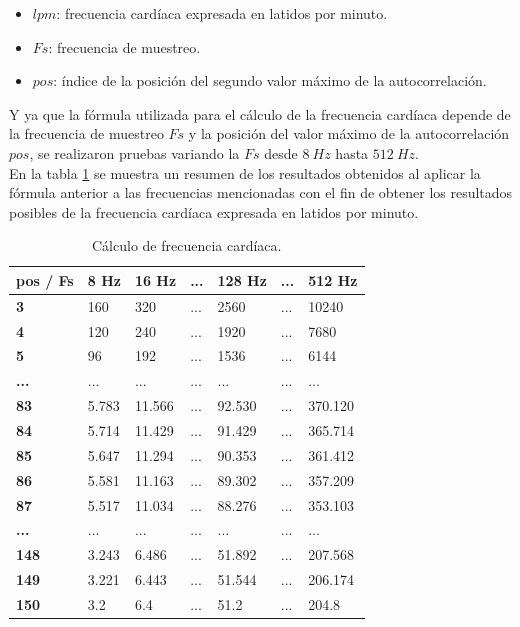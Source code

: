 \begin{itemize}
	\item $lpm$: frecuencia cardíaca expresada en latidos por minuto.
	\item $Fs$: frecuencia de muestreo.
	\item $pos$: índice de la posición del segundo valor máximo de la autocorrelación.
\end{itemize}

Y ya que la fórmula utilizada para el cálculo de la frecuencia cardíaca depende de la frecuencia de muestreo $Fs$ y la posición del valor máximo de la autocorrelación $pos$, se realizaron pruebas variando la $Fs$ desde $8\ Hz$ hasta $512\ Hz$. \\

En la tabla \ref{sensorPulso:resultadosCalculoFs} se muestra un resumen de los resultados obtenidos al aplicar la fórmula anterior a las frecuencias mencionadas con el fin de obtener los resultados posibles de la frecuencia cardíaca expresada en latidos por minuto.

\begin{table}[htbp]
	\begin{center}
		\begin{tabular}{|l|l|l|l|l|l|l|}
			\hline
			\textbf{pos / Fs} & \textbf{8 Hz} & \textbf{16 Hz} & \textbf{...} & \textbf{128 Hz} & \textbf{...} & \textbf{512 Hz} \\
			\hline \hline
			\textbf{3} & 160 & 320 & ... & 2560 & ... & 10240 \\
			\hline
			\textbf{4} & 120 & 240 & ... & 1920 & ... & 7680 \\
			\hline
			\textbf{5} & 96 & 192 & ... & 1536 & ... & 6144 \\
			\hline
			\textbf{...} & ... & ... & ... & ... & ... & ...  \\
			\hline
			\textbf{83} & 5.783 & 11.566 & ... & 92.530 & ... & 370.120 \\
			\hline
			\textbf{84} & 5.714 & 11.429 & ... & 91.429 & ... & 365.714 \\
			\hline
			\textbf{85} & 5.647 & 11.294 & ... & 90.353 & ... & 361.412 \\
			\hline
			\textbf{86} & 5.581 & 11.163 & ... & 89.302 & ... & 357.209 \\
			\hline
			\textbf{87} & 5.517 & 11.034 & ... & 88.276 & ... & 353.103 \\
			\hline
			\textbf{...} & ... & ... & ... & ... & ... & ...  \\
			\hline
			\textbf{148} & 3.243 & 6.486 & ... & 51.892 & ... & 207.568 \\
			\hline
			\textbf{149} & 3.221 & 6.443 & ... & 51.544 & ... & 206.174 \\
			\hline
			\textbf{150} & 3.2 & 6.4 & ... & 51.2 & ... & 204.8 \\
			\hline
		\end{tabular}
		\caption{Cálculo de frecuencia cardíaca.}
		\label{sensorPulso:resultadosCalculoFs}
	\end{center}
\end{table}

